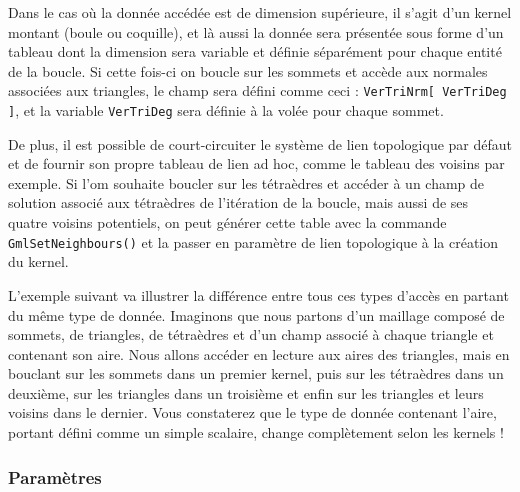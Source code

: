 \documentclass[a4paper,12pt]{article}
\begin{document}
Dans le cas où la donnée accédée est de dimension supérieure, il s'agit d'un kernel montant (boule ou coquille), et là aussi la donnée sera présentée sous forme d'un tableau dont la dimension sera variable et définie séparément pour chaque entité de la boucle. Si cette fois-ci on boucle sur les sommets et accède aux normales associées aux triangles, le champ sera défini comme ceci : {\tt VerTriNrm[ VerTriDeg ]}, et la variable {\tt VerTriDeg} sera définie à la volée pour chaque sommet.

De plus, il est possible de court-circuiter le système de lien topologique par défaut et de fournir son propre tableau de lien ad hoc, comme le tableau des voisins par exemple.
Si l'om souhaite boucler sur les tétraèdres et accéder à un champ de solution associé aux tétraèdres de l'itération de la boucle, mais aussi de ses quatre voisins potentiels, on peut générer cette table avec la commande {\tt GmlSetNeighbours()} et la passer en paramètre de lien topologique à la création du kernel.

L'exemple suivant va illustrer la différence entre tous ces types d'accès en partant du même type de donnée.
Imaginons que nous partons d'un maillage composé de sommets, de triangles, de tétraèdres et d'un champ associé à chaque triangle et contenant son aire. Nous allons accéder en lecture aux aires des triangles, mais en bouclant sur les sommets dans un premier kernel, puis sur les tétraèdres dans un deuxième, sur les triangles dans un troisième et enfin sur les triangles et leurs voisins dans le dernier. Vous constaterez que le type de donnée contenant l'aire, portant défini comme un simple scalaire, change complètement selon les kernels !

\subsubsection*{Paramètres}
\end{document}

